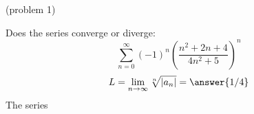 \documentclass[handout]{ximera}
\begin{document}
\begin{problem}(problem 1)

Does the series converge or diverge:
\[
\sum_{n=0}^\infty (-1)^n\left(\frac{n^2 + 2n+ 4}{4n^2 + 5}\right)^n
\]
\[
L = \lim_{n \to \infty} \sqrt[n]{\left|{a_n}\right|}= \answer{1/4}
\]
The series 
\end{problem}

\begin{center}
\begin{foldable}
\end{foldable}
\end{center}
\end{document}

